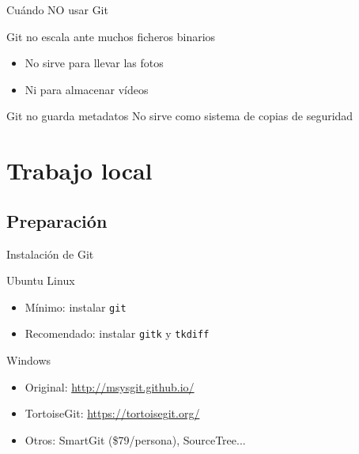 \documentclass[xcolor=svgnames]{beamer}
\newcommand*{\paquete}[1]{\texttt{#1}}
\begin{document}
\begin{frame}{Cuándo NO usar Git}

  \begin{block}{Git no escala ante muchos ficheros binarios}
    \begin{itemize}
    \item No sirve para llevar las fotos
    \item Ni para almacenar vídeos
    \end{itemize}
  \end{block}

  \begin{block}{Git no guarda metadatos}
    No sirve como sistema de copias de seguridad
  \end{block}

\end{frame}

\section[Local]{Trabajo local}

\subsection{Preparación}

\begin{frame}{Instalación de Git}
  \begin{block}{Ubuntu Linux}
    \begin{itemize}
    \item Mínimo: instalar \paquete{git}
    \item Recomendado: instalar \paquete{gitk} y \paquete{tkdiff}
    \end{itemize}
  \end{block}

  \begin{block}{Windows}
    \begin{itemize}
    \item Original: \url{http://msysgit.github.io/}
    \item TortoiseGit: \url{https://tortoisegit.org/}
    \item Otros: SmartGit (\$79/persona), SourceTree...
    \end{itemize}
  \end{block}
\end{frame}
\end{document}
